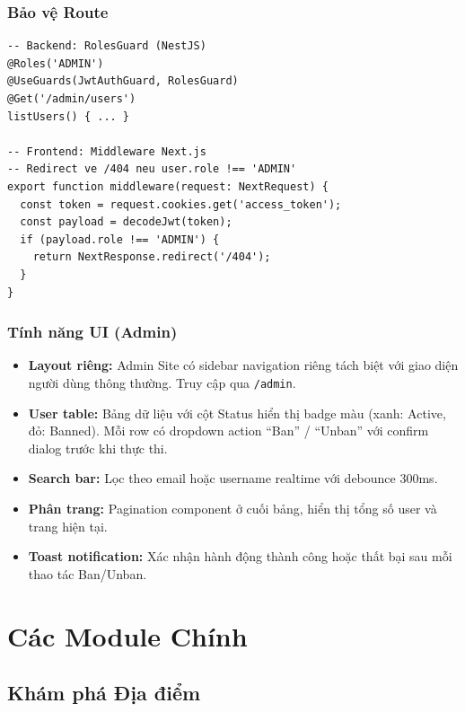 \documentclass[12pt,a4paper]{article}
\begin{document}
\subsubsection{Bảo vệ Route}

\begin{lstlisting}[language={}]
-- Backend: RolesGuard (NestJS)
@Roles('ADMIN')
@UseGuards(JwtAuthGuard, RolesGuard)
@Get('/admin/users')
listUsers() { ... }

-- Frontend: Middleware Next.js
-- Redirect ve /404 neu user.role !== 'ADMIN'
export function middleware(request: NextRequest) {
  const token = request.cookies.get('access_token');
  const payload = decodeJwt(token);
  if (payload.role !== 'ADMIN') {
    return NextResponse.redirect('/404');
  }
}
\end{lstlisting}

\subsubsection{Tính năng UI (Admin)}

\begin{itemize}
  \item \textbf{Layout riêng:} Admin Site có sidebar navigation riêng
        tách biệt với giao diện người dùng thông thường. Truy cập qua
        \texttt{/admin}.
  \item \textbf{User table:} Bảng dữ liệu với cột Status hiển thị badge
        màu (xanh: Active, đỏ: Banned). Mỗi row có dropdown action ``Ban''
        / ``Unban'' với confirm dialog trước khi thực thi.
  \item \textbf{Search bar:} Lọc theo email hoặc username realtime với
        debounce 300ms.
  \item \textbf{Phân trang:} Pagination component ở cuối bảng, hiển thị
        tổng số user và trang hiện tại.
  \item \textbf{Toast notification:} Xác nhận hành động thành công hoặc
        thất bại sau mỗi thao tác Ban/Unban.
\end{itemize}

\section{Các Module Chính}

\subsection{Khám phá Địa điểm}
\end{document}
